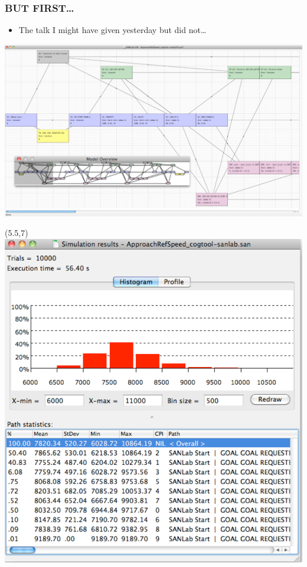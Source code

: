 \documentclass{beamer}
\begin{document}
\begin{frame}
	\frametitle{BUT FIRST\dots}
	\begin{itemize}
		\item The talk I might have given yesterday but did not\dots
	\end{itemize}
		\begin{center}
		\includegraphics[width=.75\textwidth]{../zNvBkFigs/fig4-SL}
	\end{center}
	\begin{textblock}{3}(5.5,7)	
  		\includegraphics[width=.75\textwidth]{../zNvBkFigs/fig5-SLhist}
    	   \end{textblock}
\end{frame}
\end{document}
